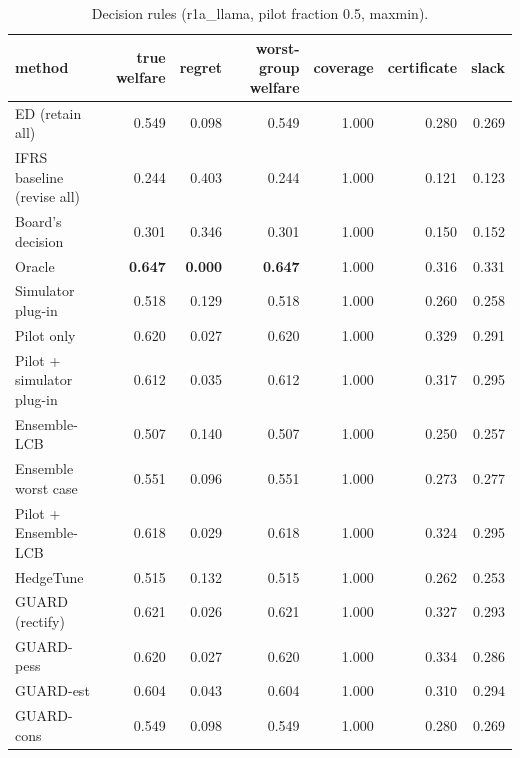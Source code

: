 \begin{table}[t]
\centering
\small
\begin{tabular}{lrrrrrr}
\toprule
method & true welfare & regret & worst-group welfare & coverage & certificate & slack \\
\midrule
ED (retain all) & 0.549 & 0.098 & 0.549 & 1.000 & 0.280 & 0.269 \\
IFRS baseline (revise all) & 0.244 & 0.403 & 0.244 & 1.000 & 0.121 & 0.123 \\
Board's decision & 0.301 & 0.346 & 0.301 & 1.000 & 0.150 & 0.152 \\
Oracle & \textbf{0.647} & \textbf{0.000} & \textbf{0.647} & 1.000 & 0.316 & 0.331 \\
Simulator plug-in & 0.518 & 0.129 & 0.518 & 1.000 & 0.260 & 0.258 \\
Pilot only & 0.620 & 0.027 & 0.620 & 1.000 & 0.329 & 0.291 \\
Pilot + simulator plug-in & 0.612 & 0.035 & 0.612 & 1.000 & 0.317 & 0.295 \\
Ensemble-LCB & 0.507 & 0.140 & 0.507 & 1.000 & 0.250 & 0.257 \\
Ensemble worst case & 0.551 & 0.096 & 0.551 & 1.000 & 0.273 & 0.277 \\
Pilot + Ensemble-LCB & 0.618 & 0.029 & 0.618 & 1.000 & 0.324 & 0.295 \\
HedgeTune & 0.515 & 0.132 & 0.515 & 1.000 & 0.262 & 0.253 \\
GUARD (rectify) & 0.621 & 0.026 & 0.621 & 1.000 & 0.327 & 0.293 \\
GUARD-pess & 0.620 & 0.027 & 0.620 & 1.000 & 0.334 & 0.286 \\
GUARD-est & 0.604 & 0.043 & 0.604 & 1.000 & 0.310 & 0.294 \\
GUARD-cons & 0.549 & 0.098 & 0.549 & 1.000 & 0.280 & 0.269 \\
\bottomrule
\end{tabular}
\caption{Decision rules (r1a\_llama, pilot fraction 0.5, maxmin).}
\label{tab:methods-maxmin}
\end{table}
